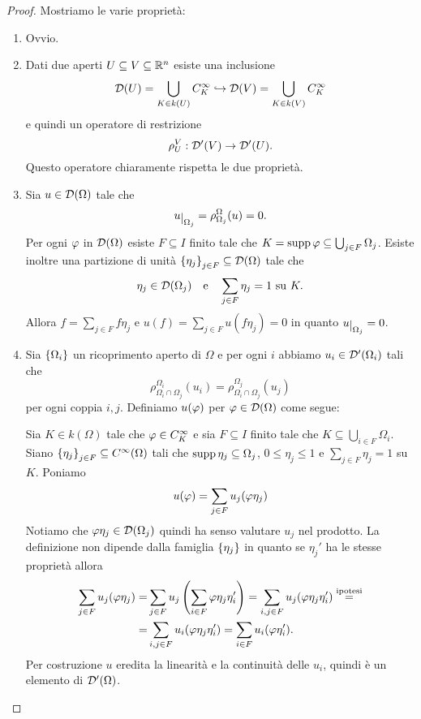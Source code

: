 \begin{proof}
Mostriamo le varie propriet\`a:
\setlength{\leftmargini}{0cm}
\begin{enumerate}
    \item Ovvio.
    \item Dati due aperti $U\subseteq V\subseteq \R^n$ esiste una inclusione
    \[\Dc(U)=\bigcup_{K\in k(U)}C^\infty_K\inj \Dc(V)=\bigcup_{K\in k(V)}C^\infty_K\]
    e quindi un operatore di restrizione
    \[\rho^V_U:\Dc'(V)\to \Dc'(U).\]
    Questo operatore chiaramente rispetta le due propriet\`a.
    \item Sia $u\in \Dc(\Omega)$ tale che
\[u\res{\Omega_j}=\rho^\Omega_{\Omega_j}(u)=0.\]
Per ogni $\vp$ in $\Dc(\Omega)$ esiste $F\subseteq I$ finito tale che $K=\supp \vp\subseteq \bigcup_{j\in F}\Omega_j$. Esiste inoltre una partizione di unit\`a $\cpa{\eta_j}_{j\in F}\subseteq \Dc(\Omega)$ tale che
\[\eta_j\in \Dc(\Omega_j)\quad\text e\quad \sum_{j\in F}\eta_j=1\text{ su }K.\]
Allora $f=\sum_{j\in F} f\eta_j$ e $u(f)=\sum_{j\in F}u(f\eta_j)=0$ in quanto $u\res{\Omega_j}=0$.
\item Sia $\cpa{\Omega_i}$ un ricoprimento aperto di $\Omega$ e per ogni $i$ abbiamo $u_i\in \Dc'(\Omega_i)$ tali che 
\[\rho^{\Omega_i}_{\Omega_{i}\cap \Omega_j}(u_i)=\rho^{\Omega_j}_{\Omega_{i}\cap \Omega_j}(u_j)\]
per ogni coppia $i,j$. Definiamo $u(\vp)$ per $\vp\in\Dc(\Omega)$ come segue:

Sia $K\in k(\Omega)$ tale che $\vp\in C^\infty_K$ e sia $F\subseteq I$ finito tale che $K\subseteq \bigcup_{i\in F}\Omega_i$. Siano $\cpa{\eta_j}_{j\in F}\subseteq C^\infty(\Omega)$ tali che $\supp\eta_j\subseteq \Omega_j$, $0\leq \eta_j\leq 1$ e $\sum_{j\in F}\eta_j=1$ su $K$.
Poniamo
\[u(\vp)=\sum_{j\in F}u_j(\vp\eta_j)\]
Notiamo che $\vp\eta_j\in\Dc(\Omega_j)$ quindi ha senso valutare $u_j$ nel prodotto.
La definizione non dipende dalla famiglia $\cpa{\eta_j}$ in quanto se $\eta_j'$ ha le stesse propriet\`a allora
\begin{align*}
    \sum_{j\in F}u_j(\vp\eta_j)=&\sum_{j\in F}u_j\pa{\sum_{i\in F}\vp\eta_j\eta_i'}=\sum_{i,j\in F}u_j(\vp\eta_j\eta_i')\pasgnl={ipotesi}\\
    =&\sum_{i,j\in F}u_i(\vp\eta_j\eta_i')=\sum_{i\in F}u_i(\vp\eta_i').
\end{align*}
Per costruzione $u$ eredita la linearit\`a e la continuit\`a delle $u_i$, quindi \`e un elemento di $\Dc'(\Omega)$.
\end{enumerate}
\setlength{\leftmargini}{0.5cm}
\end{proof}

